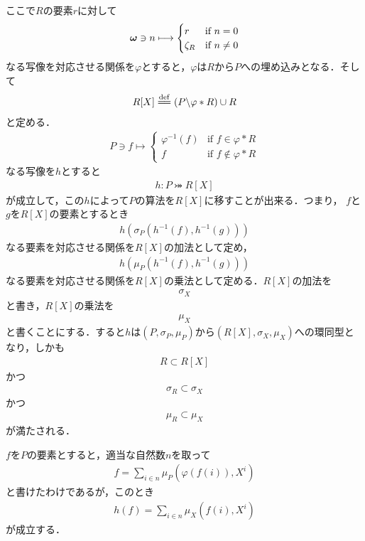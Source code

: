 	ここで$R$の要素$r$に対して
	\begin{align}
		{\boldsymbol \omega} \ni n \longmapsto
		\begin{cases}
			r & \mbox{if } n = 0 \\
			\zeta_R & \mbox{if } n \neq 0
		\end{cases}
	\end{align}
	なる写像を対応させる関係を$\varphi$とすると，$\varphi$は$R$から$P$への埋め込みとなる．そして
	\begin{align}
		R[X] \defeq \left(P \backslash \varphi \ast R\right) \cup R
	\end{align}
	と定める．
	\begin{align}
		P \ni f \longmapsto
		\begin{cases}
			\varphi^{-1}(f) & \mbox{if } f \in \varphi \ast R \\
			f & \mbox{if } f \notin \varphi \ast R
		\end{cases}
	\end{align}
	なる写像を$h$とすると
	\begin{align}
		h:P \bij R[X]
	\end{align}
	が成立して，この$h$によって$P$の算法を$R[X]$に移すことが出来る．つまり，
	$f$と$g$を$R[X]$の要素とするとき
	\begin{align}
		h\left( \sigma_P\left(h^{-1}(f),h^{-1}(g)\right) \right)
	\end{align}
	なる要素を対応させる関係を$R[X]$の加法として定め，
	\begin{align}
		h\left( \mu_P\left(h^{-1}(f),h^{-1}(g)\right) \right)
	\end{align}
	なる要素を対応させる関係を$R[X]$の乗法として定める．$R[X]$の加法を
	\begin{align}
		\sigma_X
	\end{align}
	と書き，$R[X]$の乗法を
	\begin{align}
		\mu_X
	\end{align}
	と書くことにする．すると$h$は$(P,\sigma_P,\mu_P)$から$(R[X],\sigma_X,\mu_X)$への環同型となり，しかも
	\begin{align}
		R \subset R[X]
	\end{align}
	かつ
	\begin{align}
		\sigma_R \subset \sigma_X
	\end{align}
	かつ
	\begin{align}
		\mu_R \subset \mu_X
	\end{align}
	が満たされる．
	
	$f$を$P$の要素とすると，適当な自然数$n$を取って
	\begin{align}
		f = \sum_{i \in n} \mu_P \left(\varphi(f(i)),X^i\right)
	\end{align}
	と書けたわけであるが，このとき
	\begin{align}
		h(f) = \sum_{i \in n} \mu_X \left(f(i),X^i\right)
	\end{align}
	が成立する．
	
